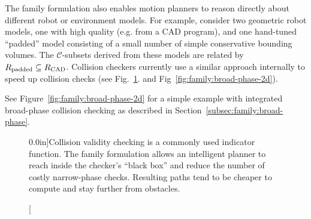 The family formulation also enables motion planners to
reason directly about different robot or environment models.
For example, consider two geometric robot models,
one with high quality (e.g. from a CAD program),
and one hand-tuned ``padded'' model consisting of 
a small number of simple conservative bounding volumes.
The $\mathcal{C}$-subsets derived from these models
are related by $R_{\mbox{\scriptsize padded}} \subseteq R_{\mbox{\scriptsize CAD}}$.
Collision checkers currently use a similar approach internally
to speed up collision checks (see Fig.~\ref{fig:family:broad-phase}.
and Fig~\ref{fig:family:broad-phase-2d}).

See Figure~\ref{fig:family:broad-phase-2d}
for a simple example with integrated broad-phase collision checking
as described in Section~\ref{subsec:family:broad-phase}.

\begin{figure}[b]
   \centering
   
   \quad%
   
   \caption[][0.0in]{Collision validity checking is a commonly used
     indicator function.
     The family formulation allows an intelligent planner to
     reach inside the checker's ``black box'' and reduce the number
     of costly narrow-phase checks.
     Resulting paths tend to be cheaper to compute and
     stay further from obstacles.}
   \label{fig:family:broad-phase}
\end{figure}

